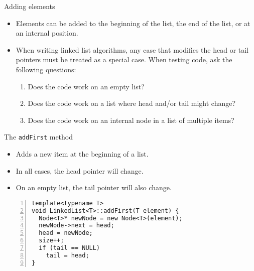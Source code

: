 \documentclass{beamer}
\begin{document}
\begin{frame}[fragile]{Adding elements}

\begin{itemize}
\item Elements can be added to the beginning of the list, the end of
  the list, or at an internal position.

\item When writing linked list algorithms, any case that modifies the
  head or tail pointers must be treated as a special case. When
  testing code, ask the following questions:

  \begin{enumerate}

  \item Does the code work on an empty list?

  \item Does the code work on a list where head and/or tail might
    change?
      
  \item Does the code work on an internal node in a list of multiple
    items?

  \end{enumerate}

\end{itemize}

\end{frame}


\begin{frame}[fragile]{The \lstinline$addFirst$ method }

\begin{itemize}
\item Adds a new item at the beginning
of a list.

\item  In all cases, the head pointer will
change. 

\item On an empty list, the tail pointer will
also change.

\end{itemize}

\begin{lstlisting}[numbers=left]
template<typename T>
void LinkedList<T>::addFirst(T element) {
  Node<T>* newNode = new Node<T>(element);
  newNode->next = head;
  head = newNode;
  size++;
  if (tail == NULL)
    tail = head;
}
\end{lstlisting}



\end{frame}
\end{document}
